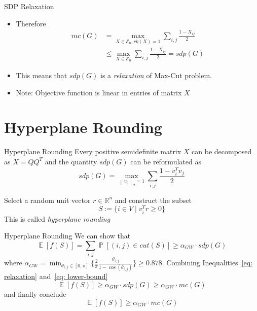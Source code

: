 \documentclass[10pt, xcolor={dvipsnames}]{beamer}
\DeclareMathOperator{\Ex}{\mathbb{E}}
\DeclareMathOperator{\Prob}{\mathbb{P}}
\newcommand{\norm}[1]{\left\lVert#1\right\rVert}
\begin{document}
\begin{frame}{SDP Relaxation}
\begin{itemize}
\item Therefore
\begin{align}
mc(G) &=
\max_{X \in \mathcal{E}_{n}, rk(X) = 1 } \sum_{i, j} \frac{1 - X_{ij}}{2}\nonumber\\ 
&\leq
\max_{X \in \mathcal{E}_{n}} \sum_{i, j} \frac{1 - X_{ij}}{2} = sdp(G)
\label{eq: relaxation}
\end{align}
\item This means that $sdp(G)$ is a {\it relaxation} of Max-Cut problem.
\item {\color{red}Note}: Objective function is linear in entries of matrix $X$
\end{itemize}
\end{frame}

\section{Hyperplane Rounding}
\begin{frame}{Hyperplane Rounding}
Every positive semidefinite matrix $X$ can be decomposed as $X = QQ^{T}$ and the quantity $sdp(G)$ can be reformulated as
\begin{equation}
sdp(G) = \max_{\norm{v_{i}}_{2} = 1} \sum_{i, j} \frac{1 - v_{i}^{T} v_{j}}{2}
\end{equation}

Select a random unit vector $r \in \mathbb{R}^{n}$ and construct the subset 
$$
S := \lbrace i \in V \mid v_{i}^{T}r \geq 0 \rbrace
$$
This is called {\it hyperplane rounding}
\end{frame}

\begin{frame}{Hyperplane Rounding}
We can show that
\begin{equation}
\Ex[f(S)] = \sum_{i, j} \Prob[(i, j) \in cut(S)] \geq \alpha_{GW} \cdot sdp(G)
\label{eq: lower-bound}
\end{equation}
where $\alpha_{GW} = \min_{\theta_{i, j} \in [0, \pi]} \lbrace 
\frac{2}{\pi}\frac{\theta_{i, j}}{ { 1 - \cos(\theta_{i, j}) }} \rbrace \geq 0.878$. 
Combining Inequalities~\ref{eq: relaxation} and~\ref{eq: lower-bound}
\begin{equation}
\Ex[f(S)] \geq \alpha_{GW} \cdot sdp(G) \geq \alpha_{GW} \cdot mc(G)
\end{equation}
and finally conclude
\begin{equation}
\Ex[f(S)] \geq \alpha_{GW} \cdot mc(G)
\end{equation}
\end{frame}
\end{document}
